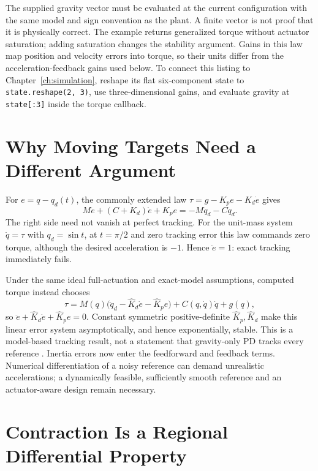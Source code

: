 The supplied gravity vector must be evaluated at the current configuration with
the same model and sign convention as the plant. A finite vector is not proof
that it is physically correct. The example returns generalized torque without
actuator saturation; adding saturation changes the stability argument. Gains in
this law map position and velocity errors into torque, so their units differ
from the acceleration-feedback gains used below.
To connect this listing to Chapter~\ref{ch:simulation}, reshape its flat
six-component state to \texttt{state.reshape(2, 3)}, use three-dimensional gains,
and evaluate gravity at \texttt{state[:3]} inside the torque callback.

\section{Why Moving Targets Need a Different Argument}

For $e=q-q_d(t)$, the commonly extended law
$\tau=g-K_pe-K_d\dot e$ gives
\[
 M\ddot e+(C+K_d)\dot e+K_pe=-M\ddot q_d-C\dot q_d.
\]
The right side need not vanish at perfect tracking. For the unit-mass system
$\ddot q=\tau$ with $q_d=\sin t$, at $t=\pi/2$ and zero tracking error this law
commands zero torque, although the desired acceleration is $-1$. Hence
$\ddot e=1$: exact tracking immediately fails.

Under the same ideal full-actuation and exact-model assumptions, computed torque
instead chooses
\[
 \tau=M(q)\bigl(\ddot q_d-\widehat K_d\dot e-\widehat K_pe\bigr)
       +C(q,\dot q)\dot q+g(q),
\]
so $\ddot e+\widehat K_d\dot e+\widehat K_pe=0$. Constant symmetric
positive-definite $\widehat K_p,\widehat K_d$ make this linear error system
asymptotically, and hence exponentially, stable. This is a model-based tracking
result, not a statement that gravity-only PD tracks every reference
\cite{LynchParkComputedTorqueReview}. Inertia errors now enter the feedforward
and feedback terms. Numerical differentiation of a noisy reference can demand
unrealistic accelerations; a dynamically feasible, sufficiently smooth reference
and an actuator-aware design remain necessary.

\section{Contraction Is a Regional Differential Property}


